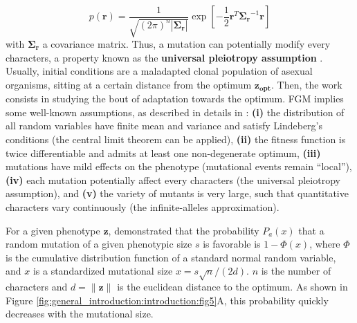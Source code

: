 \begin{equation}
p(\boldsymbol{r}) = \dfrac{1}{\sqrt{(2\pi)^n|\boldsymbol{\Sigma_r}|}} \exp \left[ -\dfrac{1}{2}\boldsymbol{r}^T \boldsymbol{\Sigma_r}^{-1} \boldsymbol{r} \right]
\end{equation}
with $\boldsymbol{\Sigma_r}$ a covariance matrix. Thus, a mutation can potentially modify every characters, a property known as the \textbf{universal pleiotropy assumption} \citep{wagner-and-zhang-2011}. Usually, initial conditions are a maladapted clonal population of asexual organisms, sitting at a certain distance from the optimum $\boldsymbol{z_{opt}}$. Then, the work consists in studying the bout of adaptation towards the optimum. FGM implies some well-known assumptions, as described in details in \cite{martin-2014}: \textbf{(i)} the distribution of all random variables have finite mean and variance and satisfy Lindeberg's conditions (the central limit theorem can be applied), \textbf{(ii)} the fitness function is twice differentiable and admits at least one non-degenerate optimum, \textbf{(iii)} mutations have mild effects on the phenotype (mutational events remain ``local''), \textbf{(iv)} each mutation potentially affect every characters (the universal pleiotropy assumption), and \textbf{(v)} the variety of mutants is very large, such that quantitative characters vary continuously (the infinite-alleles approximation).

For a given phenotype $\boldsymbol{z}$, \cite{fisher-1930} demonstrated that the probability $P_a(x)$ that a random mutation of a given phenotypic size $s$ is favorable is $1-\Phi(x)$, where $\Phi$ is the cumulative distribution function of a standard normal random variable, and $x$ is a standardized mutational size $x = s\sqrt{n}/(2d)$. $n$ is the number of characters and $d = \lVert \boldsymbol{z} \rVert$ is the euclidean distance to the optimum. As shown in Figure \ref{fig:general_introduction:introduction:fig5}A, this probability quickly decreases with the mutational size.

